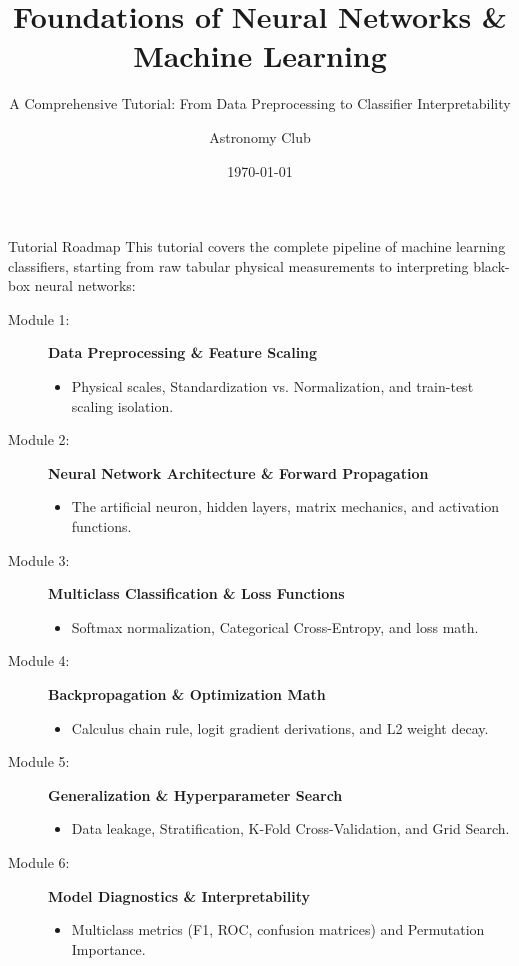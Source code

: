 \documentclass[9pt]{beamer}
\title{Foundations of Neural Networks \& Machine Learning}
\subtitle{A Comprehensive Tutorial: From Data Preprocessing to Classifier Interpretability}
\author{Astronomy Club}
\date{\today}
\begin{document}
\maketitle

\begin{frame}{Tutorial Roadmap}
  This tutorial covers the complete pipeline of machine learning classifiers, starting from raw tabular physical measurements to interpreting black-box neural networks:
  \begin{description}
    \item[Module 1:] \textbf{Data Preprocessing \& Feature Scaling}
      \begin{itemize}
        \item Physical scales, Standardization vs. Normalization, and train-test scaling isolation.
      \end{itemize}
    \item[Module 2:] \textbf{Neural Network Architecture \& Forward Propagation}
      \begin{itemize}
        \item The artificial neuron, hidden layers, matrix mechanics, and activation functions.
      \end{itemize}
    \item[Module 3:] \textbf{Multiclass Classification \& Loss Functions}
      \begin{itemize}
        \item Softmax normalization, Categorical Cross-Entropy, and loss math.
      \end{itemize}
    \item[Module 4:] \textbf{Backpropagation \& Optimization Math}
      \begin{itemize}
        \item Calculus chain rule, logit gradient derivations, and L2 weight decay.
      \end{itemize}
    \item[Module 5:] \textbf{Generalization & Hyperparameter Search}
      \begin{itemize}
        \item Data leakage, Stratification, K-Fold Cross-Validation, and Grid Search.
      \end{itemize}
    \item[Module 6:] \textbf{Model Diagnostics \& Interpretability}
      \begin{itemize}
        \item Multiclass metrics (F1, ROC, confusion matrices) and Permutation Importance.
      \end{itemize}
  \end{description}
\end{frame}
\end{document}
